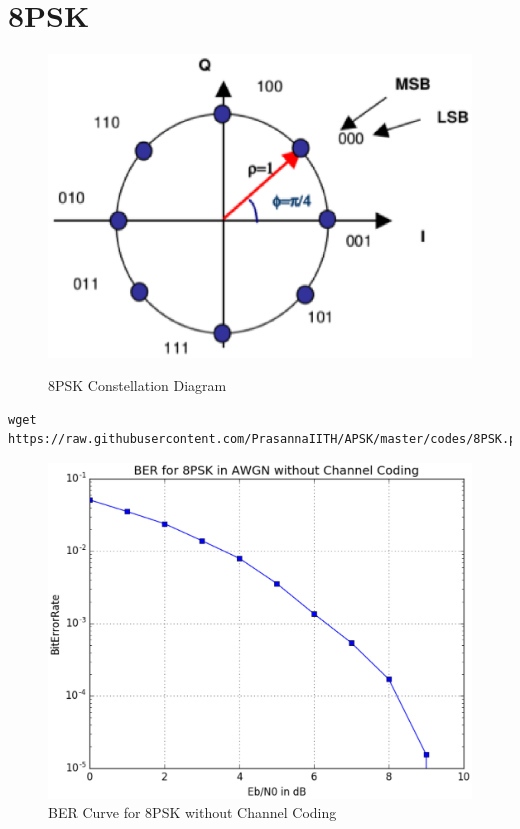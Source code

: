 \documentclass[journal,12pt,twocolumn]{IEEEtran}
\begin{document}
\section{8PSK}
\begin{figure}[h!]
\centering
\includegraphics[scale=0.4]{figs/8PSK_CON.eps}
\label{8PSK Constellation Diagram}
\caption{8PSK Constellation Diagram}
\end{figure}
\begin{lstlisting}
wget https://raw.githubusercontent.com/PrasannaIITH/APSK/master/codes/8PSK.py
\end{lstlisting}
\begin{figure}[h!]
\centering
\includegraphics[scale=0.32]{figs/8PSK.eps}
\caption{\small{BER Curve for 8PSK without Channel Coding}}
\label{BER Curve for 8PSK without Channel Coding}
\end{figure}
\end{document}
